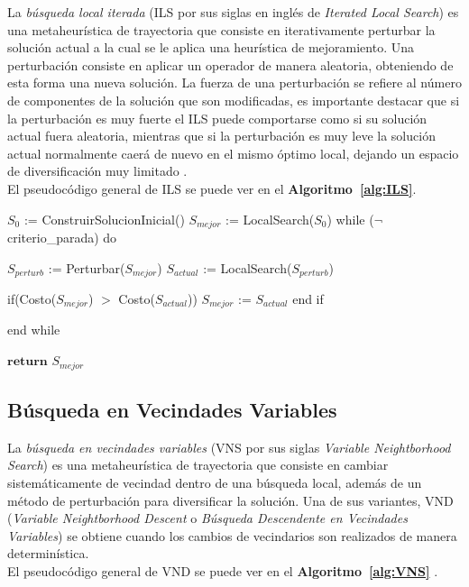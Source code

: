 La \emph{búsqueda local iterada} (ILS por sus siglas en inglés de \textit{Iterated Local Search}) es una metaheurística de trayectoria que consiste en iterativamente perturbar la solución actual a la cual se le aplica una heurística de mejoramiento. Una perturbación consiste en aplicar un operador de manera aleatoria, obteniendo de esta forma una nueva solución. La fuerza de una perturbación se refiere al número de componentes de la solución que son modificadas, es importante destacar que si la perturbación es muy fuerte el ILS puede comportarse como si su solución actual fuera aleatoria, mientras que si la perturbación es muy leve la solución actual normalmente caerá de nuevo en el mismo óptimo local, dejando un espacio de diversificación muy limitado \cite{ILSDef}. 
\\
El pseudocódigo general de ILS se puede ver en el \textbf{Algoritmo~\ref{alg:ILS}}.

\begin{code}[includerangemarker=false,frame=single,label=alg:ILS,caption=Pseudocódigo de Búsqueda Local Iterada,firstnumber=100, mathescape]
$S_0$ := ConstruirSolucionInicial()
$S_{mejor}$ := LocalSearch($S_0$)
while ($\neg$criterio_parada) do

	$S_{perturb}$ := Perturbar($S_{mejor}$)
	$S_{actual}$ := LocalSearch($S_{perturb}$)

	if(Costo($S_{mejor}$) $>$ Costo($S_{actual}$))		
		$S_{mejor}$ := $S_{actual}$		
	end if
			
end while

$\textbf{return}$ $S_{mejor}$
\end{code}

\subsection{Búsqueda en Vecindades Variables} \label{subsect:vnd}

La \emph{búsqueda en vecindades variables} (VNS por sus siglas \emph{Variable Neightborhood Search}) es una metaheurística de trayectoria que consiste en cambiar sistemáticamente de vecindad dentro de una búsqueda local, además de un método de perturbación para diversificar la solución. Una de sus variantes, VND (\emph{Variable Neightborhood Descent} o \emph{Búsqueda Descendente en Vecindades Variables}) se obtiene cuando los cambios de vecindarios son realizados de manera determinística. 
\\
El pseudocódigo general de VND se puede ver en el \textbf{Algoritmo~\ref{alg:VNS}} \cite{VNDDef}.

